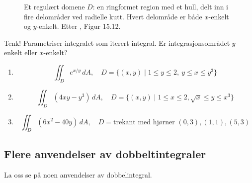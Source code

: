 \begin{figure}[ht]
\centering
{}
\caption{Et regulært domene $D$: en ringformet region med et hull, delt inn i fire delområder ved radielle kutt. Hvert delområde er både $x$-enkelt og $y$-enkelt. Etter \cite{Adams}, Figur 15.12.}
\label{fig:regulaertdomene}
\end{figure}

\begin{eks}{Tenk!}
Parametriser integralet som iterert integral. Er integrasjonsområdet $y$-enkelt eller $x$-enkelt?
\begin{enumerate}
  \item \[
    \iint_D e^{x/y}\, dA, \quad D = \{ (x, y) \mid 1 \leq y \leq 2, \ y \leq x \leq y^3 \}
  \]
  \item \[
    \iint_D (4xy - y^3)\, dA, \quad D =\{(x,y) \mid 1 \leq x \leq  2,  \sqrt{x} \leq  y \leq  x^3\}
  \]
  \item \[
    \iint_D (6x^2 - 40y)\, dA, \quad D = \textrm{trekant med hjørner } (0, 3), (1, 1), (5, 3)
  \]
\end{enumerate}
\end{eks}

\subsection{Flere anvendelser av dobbeltintegraler}
La oss se på noen anvendelser av dobbelintegral.

